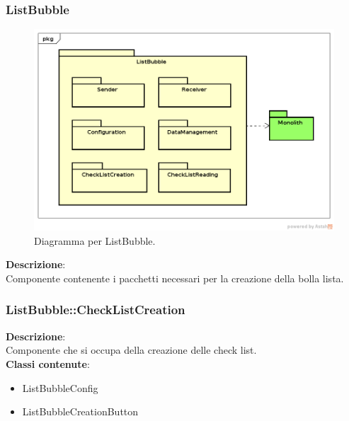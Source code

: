 \clearpage

\subsubsection{ListBubble}
   \FloatBarrier
   \begin{figure}[ht]
   \centering
\includegraphics[width=\textwidth,keepaspectratio]{img/listchecklistTop}
   \caption{Diagramma per ListBubble.}
\end{figure}
\FloatBarrier
\textbf{Descrizione}:\\
 Componente contenente i pacchetti necessari per la creazione della bolla lista. 


\clearpage

\subsubsection{ListBubble::CheckListCreation}
   \FloatBarrier
\FloatBarrier
\textbf{Descrizione}:\\
 Componente che si occupa della creazione delle check list. 
\\ \textbf{Classi contenute}:\\
\begin{itemize}
\item ListBubbleConfig
\item ListBubbleCreationButton
\end{itemize}


